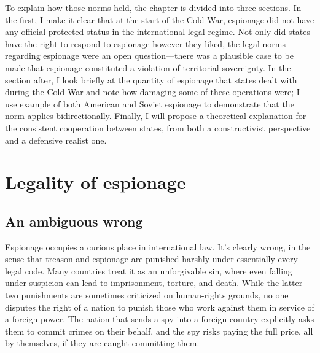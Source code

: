 \documentclass{memoir}
\begin{document}
\begin{refsegment}
To explain how those norms held, the chapter is divided into three sections. In the first, I make it clear that at the start of the Cold War, espionage did not have any official protected status in the international legal regime. Not only did states have the right to respond to espionage however they liked, the legal norms regarding espionage were an open question---there was a plausible case to be made that espionage constituted a violation of territorial sovereignty. In the section after, I look briefly at the quantity of espionage that states dealt with during the Cold War and note how damaging some of these operations were; I use example of both American and Soviet espionage to demonstrate that the norm applies bidirectionally. Finally, I will propose a theoretical explanation for the consistent cooperation between states, from both a constructivist perspective and a defensive realist one.





\section{Legality of espionage}
\subsection{An ambiguous wrong}
Espionage occupies a curious place in international law. It's clearly wrong, in the sense that treason and espionage are punished harshly under essentially every legal code. Many countries treat it as an unforgivable sin, where even falling under suspicion can lead to imprisonment, torture, and death. While the latter two punishments are sometimes criticized on human-rights grounds, no one disputes the right of a nation to punish those who work against them in service of a foreign power. The nation that sends a spy into a foreign country explicitly asks them to commit crimes on their behalf, and the spy risks paying the full price, all by themselves, if they are caught committing them.


\end{refsegment}
\end{document}
